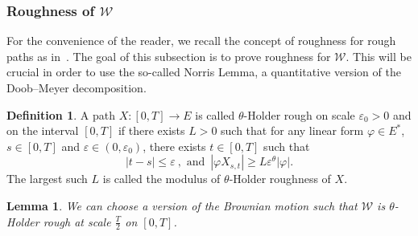 \documentclass[11pt]{article}
\newtheorem{lemm}[theo]{Lemma}
\theoremstyle{definition}
\newtheorem{defi}[theo]{Definition}
\numberwithin{equation}{section}
\numberwithin{figure}{section}
\numberwithin{table}{section}
\newcommand*\ve{\varepsilon}
\newcommand*\Wc{\mathcal{W}}
\begin{document}
\subsubsection{Roughness of \texorpdfstring{$\Wc$}{Wc}}
For the convenience of the reader, we recall the concept of roughness for rough paths as in~\cite[Definition~6.7]{FH14}. The goal of this subsection is to prove roughness for $\Wc$. This will be crucial in order to use the so-called Norris Lemma, a quantitative version of the Doob--Meyer decomposition.

\begin{defi}
A path $X:[0,T]\to E$ is called $\theta$-Holder rough on scale $\ve_0>0$ and on the interval $[0,T]$ if there exists $L>0$ such that for any linear form $\varphi \in E^*$, $s\in[0,T]$ and $\ve\in(0,\ve_0)$, there exists $t\in [0,T]$ such that
\[
|t-s|\leq \ve \ ,\text{ and } \, |\varphi X_{s,t}|\geq L\ve^\theta|\varphi|.
\]
The largest such $L$ is called the modulus of $\theta$-Holder roughness of $X$.
\end{defi}

\begin{lemm}\label{lemma:roughness}
We can choose a version of the Brownian motion such that $\Wc$ is $\theta$-Holder rough at scale $\frac{T}{2}$ on $[0,T]$.
\end{lemm}
\end{document}
